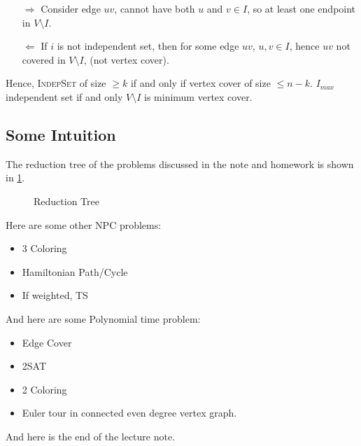 \begin{itemize}[leftmargin=.75in]
    \item[$\Longrightarrow$] Consider edge $uv$, cannot have both $u$ and $v \in I$,
        so at least one endpoint in $V \setminus I$.
    \item[$\Longleftarrow$] If $i$ is not independent set, then for some edge $uv$,
        $u,v \in I$, hence $uv$ not covered in $V \setminus I$, (not vertex cover).
\end{itemize}

Hence, \textsc{IndepSet} of size $\geq k$ if and only if vertex cover of size $\leq n-k$.
$I_{max}$ independent set if and only $V \setminus I$ is minimum vertex cover.

\subsection{Some Intuition}
The reduction tree of the problems discussed in the note and homework is shown in \cref{fig:redtree}.

\begin{figure}[H]
    \caption{Reduction Tree}\label{fig:redtree}
    \centering
\end{figure}

Here are some other NPC problems:
\begin{itemize}
    \item 3 Coloring
    \item Hamiltonian Path/Cycle
    \item If weighted, TS
\end{itemize}

And here are some Polynomial time problem:
\begin{itemize}
    \item Edge Cover
    \item 2SAT
    \item 2 Coloring
    \item Euler tour in connected even degree vertex graph.
\end{itemize}

And here is the end of the lecture note.
